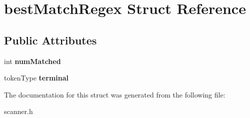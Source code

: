 \hypertarget{structbestMatchRegex}{\section{best\-Match\-Regex Struct Reference}
\label{structbestMatchRegex}
}
\subsection*{Public Attributes}
\begin{DoxyCompactItemize}
\item 
\hypertarget{structbestMatchRegex_a09f359d998398cf65e7d31a080eb2c01}{int {\bfseries num\-Matched}}\label{structbestMatchRegex_a09f359d998398cf65e7d31a080eb2c01}

\item 
\hypertarget{structbestMatchRegex_afef2c52de6332efd60cae71553bd9b0a}{token\-Type {\bfseries terminal}}\label{structbestMatchRegex_afef2c52de6332efd60cae71553bd9b0a}

\end{DoxyCompactItemize}


The documentation for this struct was generated from the following file\-:\begin{DoxyCompactItemize}
\item 
scanner.\-h\end{DoxyCompactItemize}
